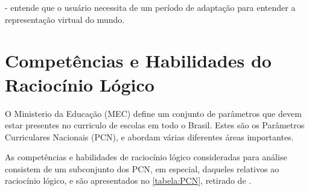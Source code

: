 - entende que o usuário necessita de um período de adaptação para entender a
representação virtual do mundo.

\section{Competências e Habilidades do Raciocínio Lógico}\label{sec-competenciashabilidades}

O Ministerio da Educação (MEC) define um conjunto de parâmetros que devem estar
presentes no curriculo de escolas em todo o Brasil. Estes são os Parâmetros
Curriculares Nacionais (PCN), e abordam várias diferentes áreas importantes. 

As competências e habilidades de raciocínio lógico consideradas para análise
consistem de um subconjunto dos PCN, em especial, daqueles relativos ao 
raciocínio lógico, e são apresentados no \autoref{tabela:PCN}, retirado de
\cite{Tabuti:2015:tabela_habilidades}.

